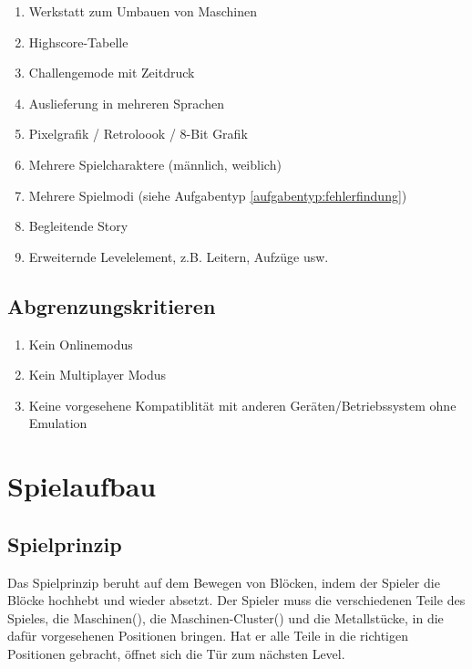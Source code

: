 \documentclass{scrartcl}
\begin{document}
\begin{enumerate}
	\item \label{wunsch:werkstatt}Werkstatt zum Umbauen von Maschinen
	\item \label{wunsch:highscore}Highscore-Tabelle
	\item \label{wunsch:challengemode}Challengemode mit Zeitdruck
	\item \label{wunsch:multilang}Auslieferung in mehreren Sprachen
	\item \label{wunsch:8bit}Pixelgrafik / Retroloook / 8-Bit Grafik
	\item \label{wunsch:multiplechar}Mehrere Spielcharaktere (männlich, weiblich)
	\item \label{wunsch:multiplemode}Mehrere Spielmodi (siehe Aufgabentyp \ref{aufgabentyp:fehlerfindung})
    \item \label{wunsch:story}Begleitende Story
    \item \label{wunsch:erweiterndeLevelelemente}Erweiternde Levelelement, z.B. Leitern, Aufzüge usw.
\end{enumerate}

\subsection{Abgrenzungskritieren}

\begin{enumerate}
	\item \label{abgrenz:online}Kein Onlinemodus
	\item \label{abgrenz:multiplayer}Kein Multiplayer Modus
	\item \label{abgrenz:emu}Keine vorgesehene Kompatiblität mit anderen Geräten/Betriebssystem ohne Emulation
\end{enumerate}

\clearpage











\section{Spielaufbau}

\subsection{Spielprinzip}
Das Spielprinzip beruht auf dem Bewegen von Blöcken, indem der Spieler die Blöcke hochhebt und wieder absetzt. Der Spieler muss die verschiedenen Teile des Spieles, die Maschinen(), die Maschinen-Cluster() und die Metallstücke, in die dafür vorgesehenen Positionen bringen. Hat er alle Teile in die richtigen Positionen gebracht, öffnet sich die Tür zum nächsten Level.
\end{document}
